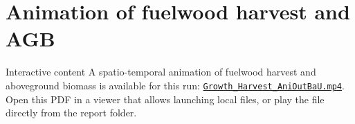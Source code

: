 \section{Animation of fuelwood harvest and AGB}
\begin{mfnote}{Interactive content}
A spatio-temporal animation of fuelwood harvest and aboveground biomass is available for this run: \href{run:assets/Growth_Harvest_AniOutBaU.mp4}{\texttt{Growth\_Harvest\_AniOutBaU.mp4}}. Open this PDF in a viewer that allows launching local files, or play the file directly from the report folder.
\end{mfnote}
